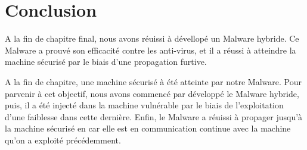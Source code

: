 \section{Conclusion}
A la fin de chapitre final, nous avons réuissi à dévellopé un Malware hybride. Ce Malware a prouvé son efficacité
contre les anti-virus, et il a réussi à atteindre la machine sécurisé par le biais d'une propagation furtive.

A la fin de chapitre, une machine sécurisé à été atteinte par notre Malware. Pour 
parvenir à cet objectif, nous avons commencé par développé le Malware hybride, puis, il a été 
injecté dans la machine vulnérable par le biais de l'exploitation d'une faiblesse dans cette dernière. 
Enfin, le Malware a réuissi à propager jusqu'à la machine sécurisé en car elle est en communication 
continue avec la machine qu'on a exploité précédemment.


